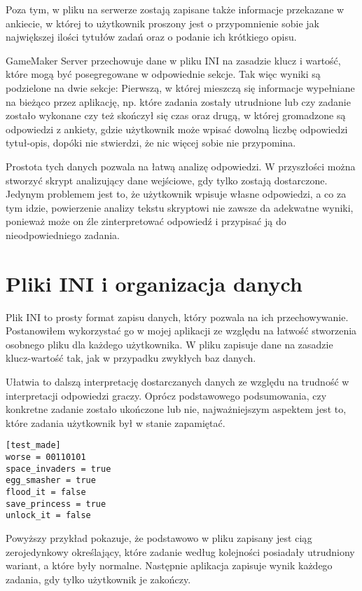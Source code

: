 \documentclass[openright]{xmgr}
\begin{document}
Poza tym, w pliku na serwerze zostają zapisane także informacje przekazane
w ankiecie, w której to użytkownik proszony jest o przypomnienie
sobie jak największej ilości tytułów zadań oraz o podanie ich krótkiego opisu.

GameMaker Server przechowuje dane w pliku INI na zasadzie klucz i wartość, które mogą być posegregowane w odpowiednie sekcje. Tak więc wyniki
są podzielone na dwie sekcje: Pierwszą, w której mieszczą się informacje wypełniane
na bieżąco przez aplikację, np. które zadania zostały utrudnione lub czy zadanie
zostało wykonane czy też skończył się czas oraz drugą, w której gromadzone są odpowiedzi z ankiety, gdzie użytkownik może wpisać dowolną liczbę odpowiedzi tytuł-opis, dopóki nie stwierdzi, że nic więcej sobie nie przypomina.

Prostota tych danych pozwala na łatwą analizę odpowiedzi. W przyszłości
można stworzyć skrypt analizujący dane wejściowe, gdy tylko zostają dostarczone.
Jedynym problemem jest to, że użytkownik wpisuje własne odpowiedzi, a co za tym idzie, powierzenie analizy tekstu skryptowi nie zawsze da adekwatne wyniki, ponieważ może on źle zinterpretować odpowiedź i przypisać ją do nieodpowiedniego zadania.

\section{Pliki INI i organizacja danych}
Plik INI to prosty format zapisu danych, który pozwala na ich przechowywanie. Postanowiłem wykorzystać go w mojej aplikacji ze względu
na łatwość stworzenia osobnego pliku dla każdego użytkownika. W pliku zapisuje
dane na zasadzie klucz-wartość tak, jak w przypadku zwykłych baz danych.

Ułatwia to dalszą interpretację dostarczanych danych ze względu na
trudność w interpretacji odpowiedzi graczy. Oprócz podstawowego podsumowania, czy konkretne zadanie zostało ukończone lub nie, najważniejszym aspektem
jest to, które zadania użytkownik był w stanie zapamiętać. 

\begin{lstlisting}[caption={Fragment pliku INI}]
[test_made]
worse = 00110101
space_invaders = true
egg_smasher = true
flood_it = false
save_princess = true
unlock_it = false
\end{lstlisting}

Powyższy przykład pokazuje, że podstawowo w pliku zapisany jest ciąg zerojedynkowy  określający, które zadanie według kolejności posiadały utrudniony
wariant, a które były normalne. Następnie aplikacja zapisuje wynik
każdego zadania, gdy tylko użytkownik je zakończy.
\end{document}
